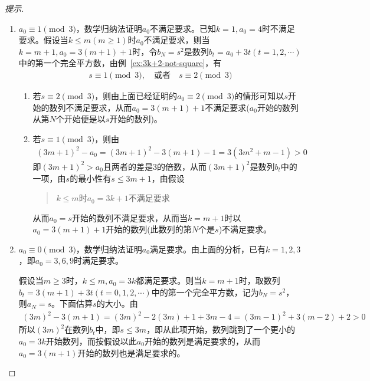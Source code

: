 \begin{proof}[提示]
\begin{enumerate}
  \item $a_0\equiv1\pmod3$，数学归纳法证明$a_0$不满足要求。已知$k=1,a_0=4$时不满足要求。假设当$k\le m(m\ge1)$时$a_0$不满足要求，则当$k=m+1, a_0=3(m +1)+1$时，令$b_N=s^2$是数列$b_t = a_0+3t(t=1,2,\cdots)$中的第一个完全平方数，由例~\ref{ex:3k+2-not-square}，有
    \begin{align*}
      s\equiv1\pmod3,\quad\text{或者}\quad s\equiv2\pmod3
    \end{align*}
    \begin{enumerate}
    \item 若$s\equiv2\pmod3$，则由上面已经证明的$a_0\equiv2\pmod3$的情形可知以$s$开始的数列不满足要求，从而$a_0=3(m+1)+1$不满足要求($a_0$开始的数列从第$N$个开始便是以$s$开始的数列)。
    \item 若$s\equiv1\pmod3$，则由
      \begin{align*}
        (3m+1)^2 - a_0 = (3m+1)^2 - 3(m+1) - 1 = 3(3m^2 + m - 1) > 0
      \end{align*}
      即$(3m+1)^2 > a_0$且两者的差是3的倍数，从而$(3m+1)^2$是数列$b_t$中的一项，由$s$的最小性有$s\le 3m+1$，由假设
      \begin{quotation}
        $k\le m$时$a_0=3k+1$不满足要求
      \end{quotation}
      从而$a_0=s$开始的数列不满足要求，从而当$k=m+1$时以$a_0=3(m+1)+1$开始的数列(此数列的第$N$个是$s$)不满足要求。
    \end{enumerate}
    
  \item $a_0\equiv0\pmod3$，数学归纳法证明$a_0$满足要求。由上面的分析，已有$k=1,2,3$，即$a_0=3,6,9$时满足要求。

    假设当$m\ge3$时，$k\le m, a_0=3k$都满足要求。则当$k=m+1$时，取数列$b_t = 3(m+1) + 3t(t=0,1,2,\cdots)$中的第一个完全平方数，记为$b_N = s^2$，则$a_N = s$。下面估算$s$的大小。由
    \begin{align*}
      (3m)^2 - 3(m+1) = (3m)^2 - 2(3m) + 1 + 3m - 4 = (3m-1)^2 + 3(m - 2) + 2 > 0
    \end{align*}
    所以$(3m)^2$在数列$b_t$中，即$s\le 3m$，即从此项开始，数列跳到了一个更小的$a_0=3k$开始数列，而按假设以此$a_0$开始的数列是满足要求的，从而$a_0=3(m+1)$开始的数列也是满足要求的。
  \end{enumerate}
\end{proof}

